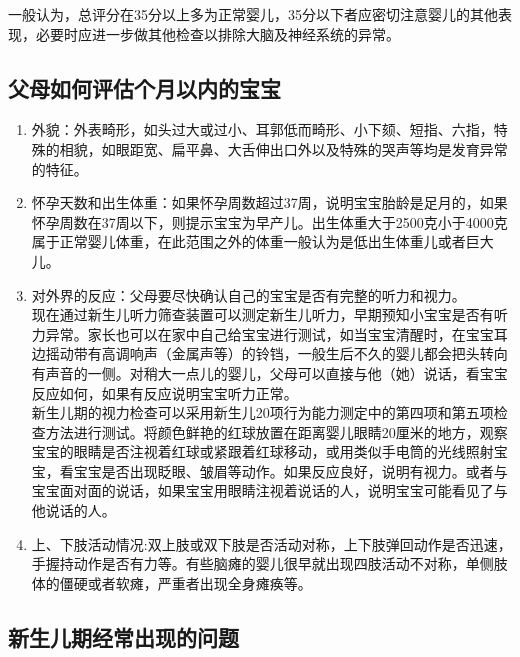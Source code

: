 一般认为，总评分在35分以上多为正常婴儿，35分以下者应密切注意婴儿的其他表现，必要时应进一步做其他检查以排除大脑及神经系统的异常。



\subsection{父母如何评估个月以内的宝宝}%

\begin{enumerate}
\item
  外貌：外表畸形，如头过大或过小、耳郭低而畸形、小下颏、短指、六指，特殊的相貌，如眼距宽、扁平鼻、大舌伸出口外以及特殊的哭声等均是发育异常的特征。
\item
  怀孕天数和出生体重：如果怀孕周数超过37周，说明宝宝胎龄是足月的，如果怀孕周数在37周以下，则提示宝宝为早产儿。出生体重大于2500克小于4000克属于正常婴儿体重，在此范围之外的体重一般认为是低出生体重儿或者巨大儿。
\item
  对外界的反应：父母要尽快确认自己的宝宝是否有完整的听力和视力。\\
  现在通过新生儿听力筛查装置可以测定新生儿听力，早期预知小宝宝是否有听力异常。家长也可以在家中自己给宝宝进行测试，如当宝宝清醒时，在宝宝耳边摇动带有高调响声（金属声等）的铃铛，一般生后不久的婴儿都会把头转向有声音的一侧。对稍大一点儿的婴儿，父母可以直接与他（她）说话，看宝宝反应如何，如果有反应说明宝宝听力正常。\\
  新生儿期的视力检查可以采用新生儿20项行为能力测定中的第四项和第五项检查方法进行测试。将颜色鲜艳的红球放置在距离婴儿眼睛20厘米的地方，观察宝宝的眼睛是否注视着红球或紧跟着红球移动，或用类似手电筒的光线照射宝宝，看宝宝是否出现眨眼、皱眉等动作。如果反应良好，说明有视力。或者与宝宝面对面的说话，如果宝宝用眼睛注视着说话的人，说明宝宝可能看见了与他说话的人。
\item
  上、下肢活动情况:双上肢或双下肢是否活动对称，上下肢弹回动作是否迅速，手握持动作是否有力等。有些脑瘫的婴儿很早就出现四肢活动不对称，单侧肢体的僵硬或者软瘫，严重者出现全身瘫痪等。
\end{enumerate}



\subsection{%
新生儿期经常出现的问题}

